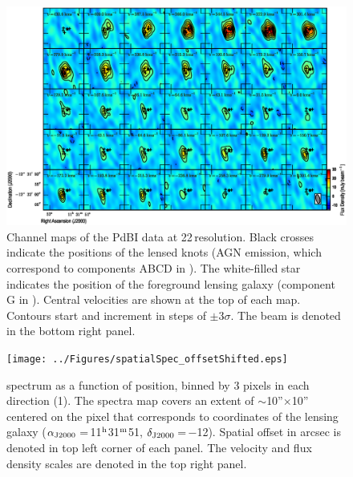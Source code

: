 \documentclass[]{emulateapj}
\begin{document}
\begin{figure}[!htbp]
\centering
\includegraphics[width=1.0\textwidth]{../Figures/co_channel_maps.eps}
\caption{
Channel maps of the PdBI \bco data at 22\,\kms resolution.
Black crosses indicate the positions of the lensed knots (AGN emission,
which correspond to components ABCD in ). The white-filled
star indicates the position of the foreground lensing galaxy (component G
in ).
Central velocities are shown at the top of each map.
Contours start and increment in steps of
$\pm$3$\sigma$. The beam is denoted in the bottom right panel. \label{fig:chanmap}}
\end{figure}

\begin{figure}[!htbp]
\centering
\texttt{[image: ../Figures/spatialSpec\_offsetShifted.eps]}
\caption{
\bco spectrum as a function of position, binned by 3 pixels in each
direction (1).
The spectra map covers an extent of $\sim$10''$\times$10''
centered on the pixel that corresponds to coordinates of the lensing galaxy ($\alpha_{\rm J2000}$\,=\,11$^{\rm h}$31$^{\rm m}$51, $\delta_{\rm J2000}$\,=\,$-$12).
Spatial offset in arcsec is denoted in top left corner of each panel.
The velocity and flux density scales are denoted in the top right panel.
\label{fig:spatialSpec}}
\end{figure}


\end{document}
